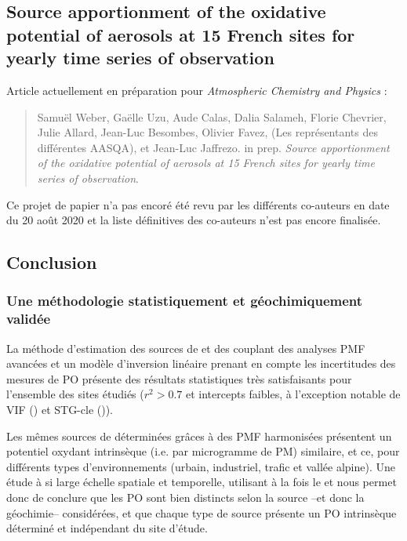 \subsection{Source apportionment of the oxidative potential of aerosols at 15 French
sites for yearly time series of observation}%
\label{sub:article}

\begin{tcolorbox}[colback=red!5!white,colframe=Melon,title=Note]
Article actuellement en préparation pour \textit{Atmospheric Chemistry and Physics} :
\begin{quote}
    Samuël Weber, Gaëlle Uzu, Aude Calas, Dalia Salameh, Florie Chevrier, Julie Allard,
    Jean-Luc Besombes, Olivier Favez, (Les représentants des différentes AASQA), et
    Jean-Luc Jaffrezo. in prep.
    \textit{Source apportionment of the oxidative potential of aerosols at 15 French
    sites for yearly time series of observation}.
\end{quote}
Ce projet de papier n'a pas encoré été revu par les différents co-auteurs en date du 20
août 2020 et la liste définitives des co-auteurs n'est pas encore finalisée.
\end{tcolorbox}

\clearpage


\subsection{Conclusion}%
\label{sec:conclusion_synthèse_OP}

\subsubsection{Une méthodologie statistiquement et géochimiquement validée}%
\label{ssub:une_méthodologie_statistiquement_et_géochimiquement_validée}

La méthode d'estimation des sources de \POAA{} et \PODTT{} des \PMdix{} couplant des
analyses PMF avancées et un modèle d'inversion linéaire prenant en compte les incertitudes
des mesures de PO présente des résultats statistiques très satisfaisants pour l'ensemble
des sites étudiés ($r^2>0.7$ et intercepts faibles, à l'exception notable de VIF (\PODTT) et
STG-cle (\POAA)).

Les mêmes sources de \PMdix{} déterminées grâces à des PMF harmonisées présentent un potentiel
oxydant intrinsèque (i.e. par microgramme de PM) similaire, et ce, pour différents types
d'environnements (urbain, industriel, trafic et vallée alpine). Une étude à si large
échelle spatiale et temporelle, utilisant à la fois le \POAA{} et \PODTT{} nous permet
donc de conclure que les PO sont bien distincts selon la source --et donc la géochimie--
considérées, et que chaque type de source présente un PO intrinsèque déterminé et
indépendant du site d'étude.

